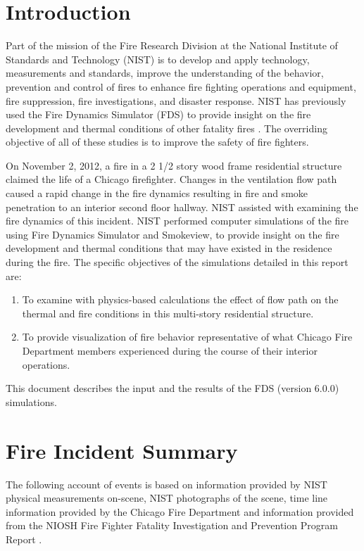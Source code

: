 \documentclass[11pt,oneside]{book}
\begin{document}
\mainmatter

\chapter{Introduction}
Part of the mission of the Fire Research Division at the National Institute of Standards and Technology (NIST) is to develop and apply technology, measurements and standards, improve the understanding of the behavior, prevention and control of fires to enhance fire fighting operations and equipment, fire suppression, fire investigations, and disaster response. NIST has previously used the Fire Dynamics Simulator (FDS) to provide insight on the fire development and thermal conditions of other fatality fires \cite{Madrzykowski:1,Iowa,Texas,Cook_County,Grosshandler:Station,Bryner:Charleston,barowy:texas}. The overriding objective of all of these studies is to improve the safety of fire fighters.

On November 2, 2012, a fire in a 2 1/2 story wood frame residential structure claimed the life of a Chicago firefighter.  Changes in the ventilation flow path caused a rapid change in the fire dynamics resulting in fire and smoke penetration to an interior second floor hallway. NIST assisted with examining the fire dynamics of this incident. NIST performed computer simulations of the fire using Fire Dynamics Simulator and Smokeview, to provide insight on the fire development and thermal conditions that may have existed in the residence during the fire. The specific objectives of the simulations detailed in this report are: 
\begin{enumerate}
\item To examine with physics-based calculations the effect of flow path on the thermal and fire conditions in this multi-story residential structure.
\item To provide visualization of fire behavior representative of what Chicago Fire Department members experienced during the course of their interior operations.
\end{enumerate}
This document describes the input and the results of the FDS (version 6.0.0) simulations.



\chapter{Fire Incident Summary}
The following account of events is based on information provided by NIST physical measurements on-scene, NIST photographs of the scene, time line information provided by the Chicago Fire Department and information provided from the NIOSH Fire Fighter Fatality Investigation and Prevention Program Report \cite{NIOSH:Bowyer}.
\end{document}
